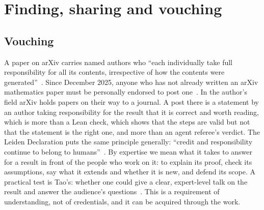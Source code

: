 \documentclass[11pt]{amsart}
\newcommand*{\sectionbreak}{\clearpage} %
\begin{document}
\sectionbreak
\section{Finding, sharing and vouching}\label{sec:position}

\subsection*{Vouching}
A paper on arXiv carries named authors who ``each individually take full
responsibility for all its contents, irrespective of how the contents were
generated''~\cite{arxiv-moderation}. Since December 2025, anyone who has not
already written an arXiv mathematics paper must be personally endorsed to post
one~\cite{arxiv-endorsement}. In the author's field arXiv holds papers on their
way to a journal. A post there is a statement by an author taking
responsibility for the result that it is correct and worth reading, which is
more than a Lean check, which shows that the steps are valid but not that the
statement is the right one, and more than an agent referee's verdict. The
Leiden Declaration puts the same principle generally: ``credit and
responsibility continue to belong to humans''~\cite{leiden}. By expertise we
mean what it takes to answer for a result in front of the people who work on
it: to explain its proof, check its assumptions, say what it extends and
whether it is new, and defend its scope. A practical test is Tao's: whether one
could give a clear, expert-level talk on the result and answer the audience's
questions~\cite{tao-age}. This is a requirement of understanding, not of
credentials, and it can be acquired through the work.
\end{document}
